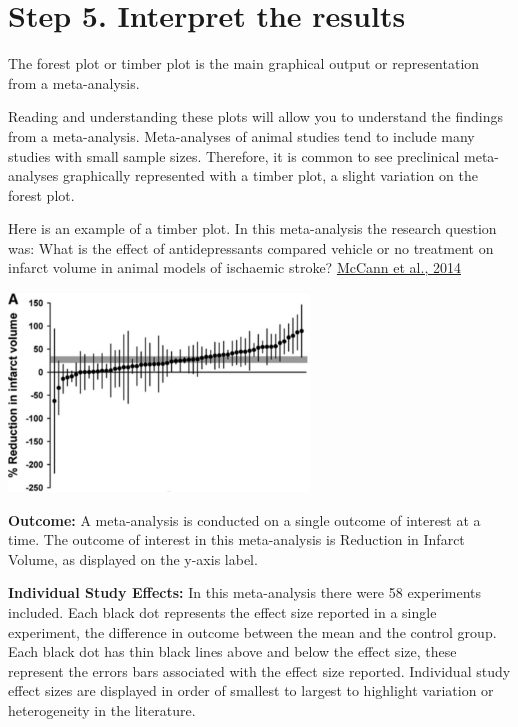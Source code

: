 \documentclass[
]{book}
\begin{document}
\hypertarget{step-5.-interpret-the-results}{%
\section{Step 5. Interpret the results}\label{step-5.-interpret-the-results}}

The forest plot or timber plot is the main graphical output or representation from a meta-analysis.

Reading and understanding these plots will allow you to understand the findings from a meta-analysis. Meta-analyses of animal studies tend to include many studies with small sample sizes. Therefore, it is common to see preclinical meta-analyses graphically represented with a timber plot, a slight variation on the forest plot.

Here is an example of a timber plot. In this meta-analysis the research question was: What is the effect of antidepressants compared vehicle or no treatment on infarct volume in animal models of ischaemic stroke? \href{https://doi.org/10.1161/STROKEAHA.114.006304}{McCann et al., 2014}

\includegraphics[width=0.6\textwidth,height=\textheight]{figs/timberplot.png}

\textbf{Outcome:}
A meta-analysis is conducted on a single outcome of interest at a time. The outcome of interest in this meta-analysis is Reduction in Infarct Volume, as displayed on the y-axis label.

\textbf{Individual Study Effects:}
In this meta-analysis there were 58 experiments included. Each black dot represents the effect size reported in a single experiment, the difference in outcome between the mean and the control group. Each black dot has thin black lines above and below the effect size, these represent the errors bars associated with the effect size reported. Individual study effect sizes are displayed in order of smallest to largest to highlight variation or heterogeneity in the literature.
\end{document}
